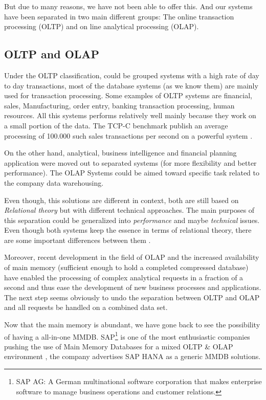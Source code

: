 \documentclass[10pt]{article} %
\begin{document}
    But due to many reasons, we have not been able to offer this. And our systems have been separated in two main different groups: The online transaction processing (OLTP) and on line analytical processing (OLAP).

\subsection{OLTP and OLAP}
    Under the OLTP classification, could be grouped systems with a high rate of day to day transactions, most of the database systems (as we know them) are mainly used for transaction processing. Some examples of OLTP systems are financial, sales, Manufacturing, order entry, banking transaction processing, human resources. All this systems performs relatively well mainly because they work on a small portion of the data. The TCP-C benchmark publish an average processing of 100.000 such sales transactions per second on a powerful system \cite{Kemper}.
    
    On the other hand, analytical, business intelligence and financial planning application were moved out to separated systems (for more flexibility and better performance). The OLAP Systems could be aimed toward specific task related to the company data warehousing. 
    
    Even though, this solutions are different in context, both are still based on \emph{ Relational theory } but with different technical approaches. The main purposes of this separation could be generalized into \emph{ performance } and maybe \emph{technical} issues. Even though both systems keep the essence in terms of relational theory, there are some important differences between them \cite{Plattner}.

    Moreover, recent development in the field of OLAP and the increased availability of main memory (sufficient enough to hold a completed compressed database) have enabled the processing of complex analytical requests in a fraction of a second and thus ease the development of new business processes and applications. The next step seems obviously to undo the separation between OLTP and OLAP and all requests be handled on a combined data set.


    Now that the main memory is abundant, we have gone back to see the possibility of having a all-in-one MMDB. SAP\footnote{SAP AG: A German multinational software corporation that makes enterprise software to manage business operations and customer relations.} is one of the most enthusiastic companies pushing the use of Main Memory Databases for a mixed OLTP \& OLAP environment \cite{Plattner}, the company advertises SAP HANA as a generic MMDB solutions. 
    
\end{document}
